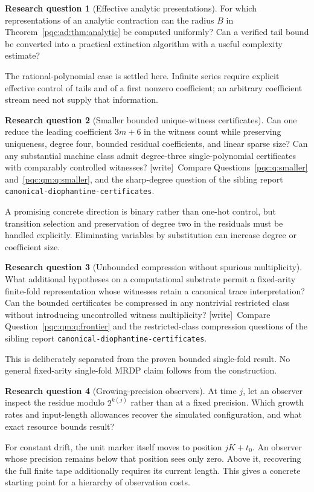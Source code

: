 \documentclass[11pt,letterpaper]{article}
\numberwithin{equation}{section}
\theoremstyle{definition}
\newtheorem{question}{Research question}
\theoremstyle{remark}
\newcommand{\code}[1]{\nolinkurl{#1}}
\newcommand{\wtag}{\textup{[write]}}
\begin{document}
\begin{question}[Effective analytic presentations]
For which representations of an analytic contraction can the radius $B$
in Theorem~\ref{pqc:ad:thm:analytic} be computed uniformly? Can a verified tail
bound be converted into a practical extinction algorithm with a useful
complexity estimate?
\end{question}
The rational-polynomial case is settled here. Infinite series require
explicit effective control of tails and of a first nonzero coefficient;
an arbitrary coefficient stream need not supply that information.

\begin{question}[Smaller bounded unique-witness certificates]\label{pqc:ad:q:smaller}
Can one reduce the leading coefficient $3m+6$ in the witness count while
preserving uniqueness, degree four, bounded residual coefficients, and
linear sparse size? Can any substantial machine class admit degree-three
single-polynomial certificates with comparably controlled witnesses?
\wtag\ Compare Questions~\ref{pqc:q:smaller} and~\ref{pqc:qm:q:smaller}, and the sharp-degree question of the sibling report \code{canonical-diophantine-certificates}.
\end{question}
A promising concrete direction is binary rather than one-hot control, but
transition selection and preservation of degree two in the residuals must
be handled explicitly. Eliminating variables by substitution can increase
degree or coefficient size.

\begin{question}[Unbounded compression without spurious multiplicity]\label{pqc:ad:q:compression}
What additional hypotheses on a computational substrate permit a
fixed-arity finite-fold representation whose witnesses retain a canonical
trace interpretation? Can the bounded certificates be compressed in any
nontrivial restricted class without introducing uncontrolled witness
multiplicity?
\wtag\ Compare Question~\ref{pqc:qm:q:frontier} and the restricted-class compression questions of the sibling report \code{canonical-diophantine-certificates}.
\end{question}
This is deliberately separated from the proven bounded single-fold result.
No general fixed-arity single-fold MRDP claim follows from the construction.

\begin{question}[Growing-precision observers]
At time $j$, let an observer inspect the residue modulo $2^{k(j)}$ rather
than at a fixed precision. Which growth rates and input-length allowances
recover the simulated configuration, and what exact resource bounds result?
\end{question}
For constant drift, the unit marker itself moves to position $jK+t_0$.
An observer whose precision remains below that position sees only zero.
Above it, recovering the full finite tape additionally requires its
current length. This gives a concrete starting point for a hierarchy of
observation costs.
\end{document}
